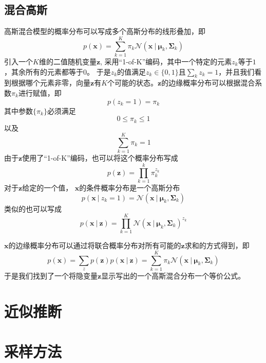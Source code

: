 \documentclass[11pt]{ctexbook}
\begin{document}
\section{混合高斯}
高斯混合模型的概率分布可以写成多个高斯分布的线形叠加，即
\begin{equation}
	p(\bm x) = \sum_{k=1}^{K}\pi_k\mathcal N(\bm x\ | \ \bm \mu_k, \bm \Sigma_k)
\end{equation}
引入一个$K$维的二值随机变量$\bm z$, 采用“1-of-K”编码，其中一个特定的元素$z_k$等于$1$，其余所有的元素都等于$0$。 于是$z_k$的值满足$z_k \in \{0, 1\}$且$\sum_k z_k = 1$，并且我们看到根据哪个元素非零，向量$\bm z$有$K$个可能的状态。$\bm z$的边缘概率分布可以根据混合系数$\pi_k$进行赋值，即
\begin{equation}
	p(z_k=1) = \pi_k
\end{equation}
其中参数$\{\pi_k\}$必须满足
\begin{equation}
	0 \leqslant \pi_k \leqslant 1
\end{equation}
以及
\begin{equation}
	\sum_{k=1}^{K} \pi_k = 1
\end{equation}
由于$\bm z$使用了“1-of-K”编码，也可以将这个概率分布写成
\begin{equation}
	p(\bm z) = \prod_{k=1}^{k}\pi_k^{z_k}
\end{equation}
对于$\bm z$给定的一个值， $\bm x$的条件概率分布是一个高斯分布
\begin{equation}
	p(\bm x\ |\  z_k= 1) = \mathcal N (\bm x\ |\ \bm \mu_k, \bm \Sigma_k )
\end{equation}
类似的也可以写成
\begin{equation}
	p(\bm x \ | \ \bm z) = \prod_{k=1}^{K} \mathcal N (\bm x \ |\ \bm \mu_k, \bm \Sigma_k ) ^ {z_k}
\end{equation}

$\bm x $的边缘概率分布可以通过将联合概率分布对所有可能的$\bm z$求和的方式得到，即
\begin{equation}
	p(\bm x) = \sum_z p(\bm z)p(\bm x \ |\ \bm z) = \sum_{k=1}^{K}\pi_k \mathcal N(\bm x \ |\ \bm \mu_k, \bm \Sigma_k)
\end{equation}
于是我们找到了一个将隐变量$\bm z$显示写出的一个高斯混合分布一个等价公式。

\chapter{近似推断}

\chapter{采样方法}
\end{document}
